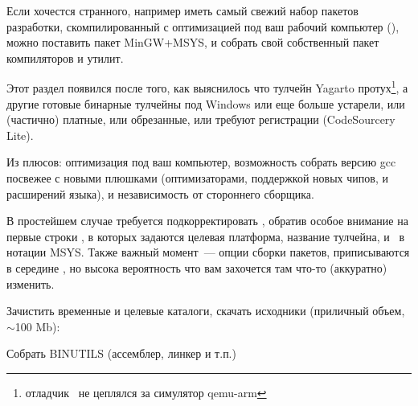 


Если хочестся странного, например иметь самый свежий набор пакетов разработки,
скомпилированный с оптимизацией под ваш рабочий компьютер (),
можно поставить пакет MinGW+MSYS, и собрать свой собственный пакет компиляторов
и утилит.

\bigskip
Этот раздел появился после того, как выяснилось что тулчейн Yagarto
протух\footnote{отладчик \gdb\ не цеплялся за симулятор qemu-arm}, а другие
готовые бинарные тулчейны под Windows или еще больше устарели, или (частично) 
платные, или обрезанные, или требуют регистрации (CodeSourcery Lite).

\bigskip
{}

Из плюсов: оптимизация под ваш компьютер, возможность собрать версию gcc
посвежее с новыми плюшками (оптимизаторами, поддержкой новых чипов, и расширений
языка), и независимость от стороннего сборщика.
\bigskip

В простейшем случае требуется подкорректировать ,
обратив особое внимание на первые строки \makefile, в которых задаются целевая
платформа, название тулчейна, и \ в нотации
MSYS. Также важный момент\ --- опции сборки пакетов, приписываются в середине
\makefile, но высока вероятность что вам захочется там что-то (аккуратно)
изменить.

\bigskip

\bigskip
{}

\bigskip
{}
\bigskip


Зачистить временные и целевые каталоги, скачать исходники (приличный объем,
$\sim$100 Mb):


Собрать BINUTILS (ассемблер, линкер и т.п.)


